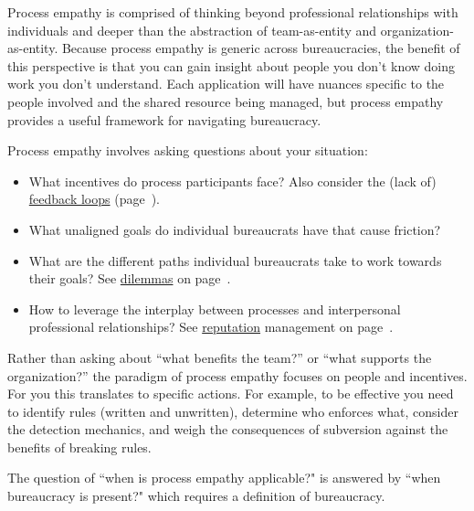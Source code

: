 Process empathy is comprised of thinking beyond professional relationships with individuals and deeper than the abstraction of team-as-entity and organization-as-entity. 
Because process empathy is generic across bureaucracies, the benefit of this perspective is that you can gain insight about people you don't know doing work you don't understand.
Each application will have nuances specific to the people involved and the shared resource being managed, but process empathy provides a useful framework for navigating bureaucracy.


Process empathy involves asking questions about your situation:
\begin{itemize}
    \item What incentives do process participants face?
Also consider the (lack of) \hyperref[sec:feedback-loop-and-ripples]{feedback loops} (page~\pageref{sec:feedback-loop-and-ripples}).
    \item What unaligned goals do individual bureaucrats have that cause friction?
    \item What are the different paths individual bureaucrats take to work towards their goals?
See \hyperref[sec:dilemma-trilemma]{dilemmas} on page~\pageref{sec:dilemma-trilemma}.
    \item How to leverage the interplay between processes and interpersonal professional relationships?
See \hyperref[sec:reputation]{reputation} management on page~\pageref{sec:reputation}.
\end{itemize}

Rather than asking about ``what benefits the team?'' or ``what supports the organization?'' the paradigm of process empathy focuses on people and incentives. For you this translates to specific actions. For example, to be effective you need to 
identify rules (written and unwritten), determine who enforces what, consider the detection mechanics, and weigh the consequences of subversion against the benefits of breaking rules.


The question of ``when is process empathy applicable?" is answered by ``when bureaucracy is present?" which requires a definition of bureaucracy. 
